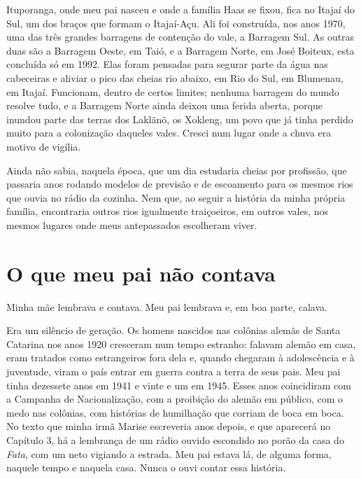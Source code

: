 \documentclass[
  brazilian,
  11pt,
  openany]{book}
\begin{document}
Ituporanga, onde meu pai nasceu e onde a família Haas se fixou, fica no
Itajaí do Sul, um dos braços que formam o Itajaí-Açu. Ali foi
construída, nos anos 1970, uma das três grandes barragens de contenção
do vale, a Barragem Sul. As outras duas são a Barragem Oeste, em Taió, e
a Barragem Norte, em José Boiteux, esta concluída só em 1992. Elas foram
pensadas para segurar parte da água nas cabeceiras e aliviar o pico das
cheias rio abaixo, em Rio do Sul, em Blumenau, em Itajaí. Funcionam,
dentro de certos limites; nenhuma barragem do mundo resolve tudo, e a
Barragem Norte ainda deixou uma ferida aberta, porque inundou parte das
terras dos Laklãnõ, os Xokleng, um povo que já tinha perdido muito para
a colonização daqueles vales. Cresci num lugar onde a chuva era motivo
de vigília.

Ainda não sabia, naquela época, que um dia estudaria cheias por
profissão, que passaria anos rodando modelos de previsão e de escoamento
para os mesmos rios que ouvia no rádio da cozinha. Nem que, ao seguir a
história da minha própria família, encontraria outros rios igualmente
traiçoeiros, em outros vales, nos mesmos lugares onde meus antepassados
escolheram viver.

\section{O que meu pai não contava}\label{o-que-meu-pai-nuxe3o-contava}

Minha mãe lembrava e contava. Meu pai lembrava e, em boa parte, calava.

Era um silêncio de geração. Os homens nascidos nas colônias alemãs de
Santa Catarina nos anos 1920 cresceram num tempo estranho: falavam
alemão em casa, eram tratados como estrangeiros fora dela e, quando
chegaram à adolescência e à juventude, viram o país entrar em guerra
contra a terra de seus pais. Meu pai tinha dezessete anos em 1941 e
vinte e um em 1945. Esses anos coincidiram com a Campanha de
Nacionalização, com a proibição do alemão em público, com o medo nas
colônias, com histórias de humilhação que corriam de boca em boca. No
texto que minha irmã Marise escreveria anos depois, e que aparecerá no
Capítulo 3, há a lembrança de um rádio ouvido escondido no porão da casa
do \emph{Fata}, com um neto vigiando a estrada. Meu pai estava lá, de
alguma forma, naquele tempo e naquela casa. Nunca o ouvi contar essa
história.
\end{document}
